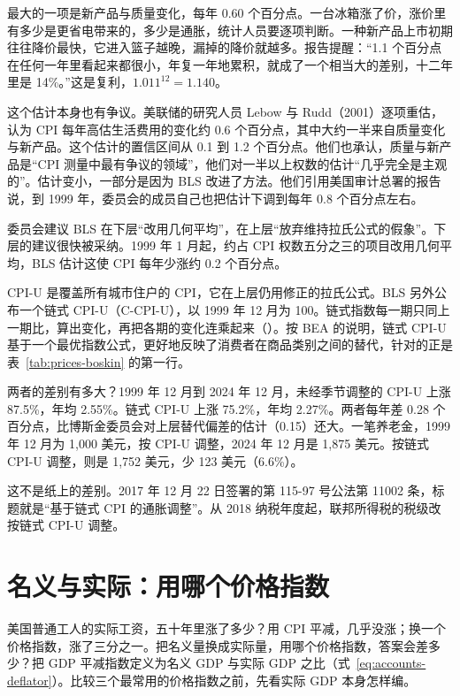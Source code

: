 最大的一项是新产品与质量变化，每年 0.60 个百分点。一台冰箱涨了价，涨价里有多少是更省电带来的，多少是通胀，统计人员要逐项判断。一种新产品上市初期往往降价最快，它进入篮子越晚，漏掉的降价就越多。报告提醒：“1.1 个百分点在任何一年里看起来都很小，年复一年地累积，就成了一个相当大的差别，十二年里是 14\%。”\cite{boskin1996}这是复利，$1.011^{12}=1.140$。

这个估计本身也有争议。美联储的研究人员 Lebow 与 Rudd（2001）逐项重估，认为 CPI 每年高估生活费用的变化约 0.6 个百分点，其中大约一半来自质量变化与新产品。这个估计的置信区间从 0.1 到 1.2 个百分点。他们也承认，质量与新产品是“CPI 测量中最有争议的领域”，他们对一半以上权数的估计“几乎完全是主观的”。估计变小，一部分是因为 BLS 改进了方法。他们引用美国审计总署的报告说，到 1999 年，委员会的成员自己也把估计下调到每年 0.8 个百分点左右\cite{lebow2001}。

委员会建议 BLS 在下层“改用几何平均”，在上层“放弃维持拉氏公式的假象”\cite{boskin1996}。下层的建议很快被采纳。1999 年 1 月起，约占 CPI 权数五分之三的项目改用几何平均，BLS 估计这使 CPI 每年少涨约 0.2 个百分点\cite{lebow2001}。

CPI-U 是覆盖所有城市住户的 CPI，它在上层仍用修正的拉氏公式\cite{mccully2007}。BLS 另外公布一个链式 CPI-U（C-CPI-U），以 1999 年 12 月为 100。链式指数每一期只同上一期比，算出变化，再把各期的变化连乘起来（）。按 BEA 的说明，链式 CPI-U 基于一个最优指数公式，更好地反映了消费者在商品类别之间的替代\cite{mccully2007}，针对的正是表~\ref{tab:prices-boskin} 的第一行。

两者的差别有多大？1999 年 12 月到 2024 年 12 月，未经季节调整的 CPI-U 上涨 87.5\%，年均 2.55\%。链式 CPI-U 上涨 75.2\%，年均 2.27\%\cite{fred2026}。两者每年差 0.28 个百分点，比博斯金委员会对上层替代偏差的估计（0.15）还大。一笔养老金，1999 年 12 月为 1,000 美元，按 CPI-U 调整，2024 年 12 月是 1,875 美元。按链式 CPI-U 调整，则是 1,752 美元，少 123 美元（6.6\%）。

这不是纸上的差别。2017 年 12 月 22 日签署的第 115-97 号公法第 11002 条，标题就是“基于链式 CPI 的通胀调整”。从 2018 纳税年度起，联邦所得税的税级改按链式 CPI-U 调整\cite{pl115_97}。

\section{名义与实际：用哪个价格指数}\label{sec:prices-real}

美国普通工人的实际工资，五十年里涨了多少？用 CPI 平减，几乎没涨；换一个价格指数，涨了三分之一。把名义量换成实际量，用哪个价格指数，答案会差多少？把 GDP 平减指数定义为名义 GDP 与实际 GDP 之比（式~\eqref{eq:accounts-deflator}）。比较三个最常用的价格指数之前，先看实际 GDP 本身怎样编。

